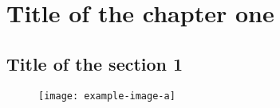 \documentclass[11pt]{memoir}
\begin{document}
\setcounter{secnumdepth}{3}
\thispagestyle{empty}


\tableofcontents

\chapter{Title of the chapter one}\label{chap1}
\section{Title of the section 1}
\lipsum[1-2]

\begin{figure}[ht!]
    \centering
    \texttt{[image: example-image-a]}
    \caption{\lipsum[1]}
    \label{fig:enter-label}
\end{figure}




\end{document}
